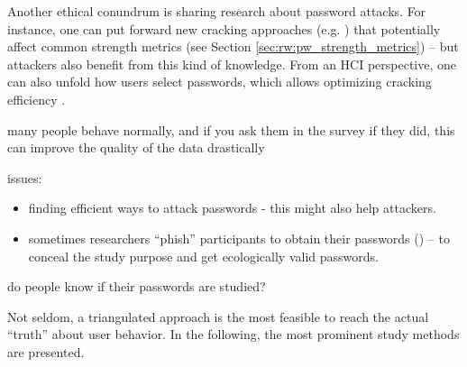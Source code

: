 Another ethical conundrum is sharing research about password attacks. For instance, one can put forward new cracking approaches (e.g. \cite{Marechal2008AdvancesPWCracking, Narayanan2005FastDictionaryAttacks, Weir2009PCFG}) that potentially affect common strength metrics (see Section \ref{sec:rw:pw_strength_metrics}) -- but attackers also benefit from this kind of knowledge. From an HCI perspective, one can also unfold how users select passwords, which allows optimizing cracking efficiency \cite{Weir2010MetricsPolicies, Wheeler2016zxcvbn}. 



 many people behave normally, and if you ask them in the survey if they did, this can improve the quality of the data drastically \cite{Fahl2013EcologicalValidityPasswordStudy}

issues:
\begin{itemize}
	\item finding efficient ways to attack passwords - this might also help attackers. 
	\item sometimes researchers ``phish'' participants to obtain their passwords (\cite{Egelman2013DoesMyPasswordGoUpToEleven, Haque2014Hierarchy, Mazurek2013Measuring}) -- to conceal the study purpose and get ecologically valid passwords. 
\end{itemize}

do people know if their passwords are studied?


Not seldom, a triangulated approach is the most feasible to reach the actual ``truth'' about user behavior. In the following, the most prominent study methods are presented. 


%
%
%

\cite{Harbach2016HardLockLife,Henze2013EmpiricalResearchUbiquitous,Kuhn1993ParticipatoryDesign,VonZezschwitz2013SurvivalShortest,Hassenzahl2003AttrakDiffGerman,Mazurek2013Measuring,Egelman2015SeBIS,Rosoff2014BehavioralExperimentsFraud,Savage2012GainingWisdomCrowds}


